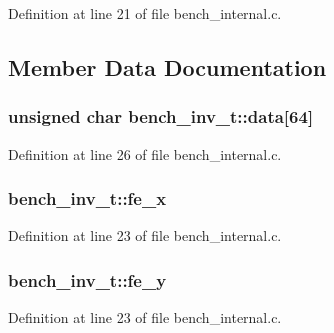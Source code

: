 Definition at line 21 of file bench\+\_\+internal.\+c.



\subsection{Member Data Documentation}
\hypertarget{structbench__inv__t_a56475198397964faa420c67fb2af4c7c}{}
\subsubsection[{data}]{\setlength{\rightskip}{0pt plus 5cm}unsigned char bench\+\_\+inv\+\_\+t\+::data\mbox{[}64\mbox{]}}\label{structbench__inv__t_a56475198397964faa420c67fb2af4c7c}


Definition at line 26 of file bench\+\_\+internal.\+c.

\hypertarget{structbench__inv__t_a295aac5b6fa7c667c2869472e2512a4b}{}
\subsubsection[{fe\+\_\+x}]{ bench\+\_\+inv\+\_\+t\+::fe\+\_\+x}\label{structbench__inv__t_a295aac5b6fa7c667c2869472e2512a4b}


Definition at line 23 of file bench\+\_\+internal.\+c.

\hypertarget{structbench__inv__t_af075523af15e7d92c74dd0748e8227af}{}
\subsubsection[{fe\+\_\+y}]{ bench\+\_\+inv\+\_\+t\+::fe\+\_\+y}\label{structbench__inv__t_af075523af15e7d92c74dd0748e8227af}


Definition at line 23 of file bench\+\_\+internal.\+c.

\hypertarget{structbench__inv__t_a61098b92fed00ae0f9f28707a9651f1d}{}
